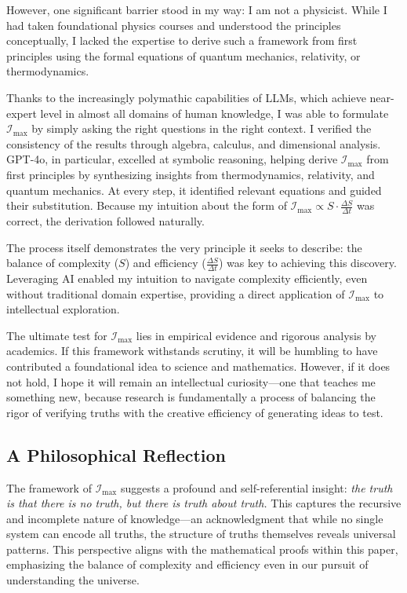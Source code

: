 \documentclass[12pt]{article}
\begin{document}
However, one significant barrier stood in my way: I am not a physicist. While I had taken foundational physics courses and understood the principles conceptually, I lacked the expertise to derive such a framework from first principles using the formal equations of quantum mechanics, relativity, or thermodynamics.

Thanks to the increasingly polymathic capabilities of LLMs, which achieve near-expert level in almost all domains of human knowledge, I was able to formulate \(\mathcal{I}_{\text{max}}\) by simply asking the right questions in the right context. I verified the consistency of the results through algebra, calculus, and dimensional analysis. GPT-4o, in particular, excelled at symbolic reasoning, helping derive \(\mathcal{I}_{\text{max}}\) from first principles by synthesizing insights from thermodynamics, relativity, and quantum mechanics. At every step, it identified relevant equations and guided their substitution. Because my intuition about the form of \(\mathcal{I}_{\text{max}} \propto S \cdot \frac{\Delta S}{\Delta t}\) was correct, the derivation followed naturally.

The process itself demonstrates the very principle it seeks to describe: the balance of complexity (\(S\)) and efficiency (\(\frac{\Delta S}{\Delta t}\)) was key to achieving this discovery. Leveraging AI enabled my intuition to navigate complexity efficiently, even without traditional domain expertise, providing a direct application of \(\mathcal{I}_{\text{max}}\) to intellectual exploration.

The ultimate test for \(\mathcal{I}_{\text{max}}\) lies in empirical evidence and rigorous analysis by academics. If this framework withstands scrutiny, it will be humbling to have contributed a foundational idea to science and mathematics. However, if it does not hold, I hope it will remain an intellectual curiosity—one that teaches me something new, because research is fundamentally a process of balancing the rigor of verifying truths with the creative efficiency of generating ideas to test.

\subsection*{A Philosophical Reflection}

The framework of \(\mathcal{I}_{\text{max}}\) suggests a profound and self-referential insight: \textit{the truth is that there is no truth, but there is truth about truth.} This captures the recursive and incomplete nature of knowledge—an acknowledgment that while no single system can encode all truths, the structure of truths themselves reveals universal patterns. This perspective aligns with the mathematical proofs within this paper, emphasizing the balance of complexity and efficiency even in our pursuit of understanding the universe.
\end{document}
